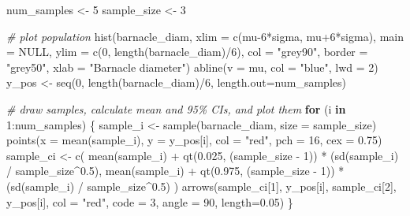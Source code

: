 \documentclass[
  11pt,
  a4paper,
]{book}
\newenvironment{Shaded}{\begin{snugshade}}{\end{snugshade}}
\newcommand{\AttributeTok}[1]{\textcolor[rgb]{0.77,0.63,0.00}{#1}}
\newcommand{\CommentTok}[1]{\textcolor[rgb]{0.56,0.35,0.01}{\textit{#1}}}
\newcommand{\ConstantTok}[1]{\textcolor[rgb]{0.00,0.00,0.00}{#1}}
\newcommand{\ControlFlowTok}[1]{\textcolor[rgb]{0.13,0.29,0.53}{\textbf{#1}}}
\newcommand{\DecValTok}[1]{\textcolor[rgb]{0.00,0.00,0.81}{#1}}
\newcommand{\FloatTok}[1]{\textcolor[rgb]{0.00,0.00,0.81}{#1}}
\newcommand{\FunctionTok}[1]{\textcolor[rgb]{0.00,0.00,0.00}{#1}}
\newcommand{\NormalTok}[1]{#1}
\newcommand{\OtherTok}[1]{\textcolor[rgb]{0.56,0.35,0.01}{#1}}
\newcommand{\SpecialCharTok}[1]{\textcolor[rgb]{0.00,0.00,0.00}{#1}}
\newcommand{\StringTok}[1]{\textcolor[rgb]{0.31,0.60,0.02}{#1}}
\begin{document}
\begin{Shaded}
\begin{Highlighting}[]
\NormalTok{num\_samples }\OtherTok{\textless{}{-}} \DecValTok{5}
\NormalTok{sample\_size }\OtherTok{\textless{}{-}} \DecValTok{3}

\CommentTok{\# plot population}
\FunctionTok{hist}\NormalTok{(barnacle\_diam, }\AttributeTok{xlim =} \FunctionTok{c}\NormalTok{(mu}\DecValTok{{-}6}\SpecialCharTok{*}\NormalTok{sigma, mu}\SpecialCharTok{+}\DecValTok{6}\SpecialCharTok{*}\NormalTok{sigma), }
     \AttributeTok{main =} \ConstantTok{NULL}\NormalTok{, }\AttributeTok{ylim =} \FunctionTok{c}\NormalTok{(}\DecValTok{0}\NormalTok{, }\FunctionTok{length}\NormalTok{(barnacle\_diam)}\SpecialCharTok{/}\DecValTok{6}\NormalTok{),}
     \AttributeTok{col =} \StringTok{"grey90"}\NormalTok{, }\AttributeTok{border =} \StringTok{"grey50"}\NormalTok{, }\AttributeTok{xlab =} \StringTok{"Barnacle diameter"}\NormalTok{)}
\FunctionTok{abline}\NormalTok{(}\AttributeTok{v =}\NormalTok{ mu, }\AttributeTok{col =} \StringTok{"blue"}\NormalTok{, }\AttributeTok{lwd =} \DecValTok{2}\NormalTok{)}
\NormalTok{y\_pos }\OtherTok{\textless{}{-}} \FunctionTok{seq}\NormalTok{(}\DecValTok{0}\NormalTok{, }\FunctionTok{length}\NormalTok{(barnacle\_diam)}\SpecialCharTok{/}\DecValTok{6}\NormalTok{, }\AttributeTok{length.out=}\NormalTok{num\_samples)}

\CommentTok{\# draw samples, calculate mean and 95\% CIs, and plot them}
\ControlFlowTok{for}\NormalTok{ (i }\ControlFlowTok{in} \DecValTok{1}\SpecialCharTok{:}\NormalTok{num\_samples) \{}
\NormalTok{  sample\_i }\OtherTok{\textless{}{-}} \FunctionTok{sample}\NormalTok{(barnacle\_diam, }\AttributeTok{size =}\NormalTok{ sample\_size)}
  \FunctionTok{points}\NormalTok{(}\AttributeTok{x =} \FunctionTok{mean}\NormalTok{(sample\_i), }\AttributeTok{y =}\NormalTok{ y\_pos[i], }\AttributeTok{col =} \StringTok{"red"}\NormalTok{, }\AttributeTok{pch =} \DecValTok{16}\NormalTok{, }\AttributeTok{cex =} \FloatTok{0.75}\NormalTok{)}
\NormalTok{  sample\_ci }\OtherTok{\textless{}{-}} \FunctionTok{c}\NormalTok{(}
    \FunctionTok{mean}\NormalTok{(sample\_i) }\SpecialCharTok{+} \FunctionTok{qt}\NormalTok{(}\FloatTok{0.025}\NormalTok{, (sample\_size }\SpecialCharTok{{-}} \DecValTok{1}\NormalTok{)) }\SpecialCharTok{*}\NormalTok{ (}\FunctionTok{sd}\NormalTok{(sample\_i) }\SpecialCharTok{/}\NormalTok{ sample\_size}\SpecialCharTok{\^{}}\FloatTok{0.5}\NormalTok{),}
    \FunctionTok{mean}\NormalTok{(sample\_i) }\SpecialCharTok{+} \FunctionTok{qt}\NormalTok{(}\FloatTok{0.975}\NormalTok{, (sample\_size }\SpecialCharTok{{-}} \DecValTok{1}\NormalTok{)) }\SpecialCharTok{*}\NormalTok{ (}\FunctionTok{sd}\NormalTok{(sample\_i) }\SpecialCharTok{/}\NormalTok{ sample\_size}\SpecialCharTok{\^{}}\FloatTok{0.5}\NormalTok{)}
\NormalTok{  )}
  \FunctionTok{arrows}\NormalTok{(sample\_ci[}\DecValTok{1}\NormalTok{], y\_pos[i], sample\_ci[}\DecValTok{2}\NormalTok{], y\_pos[i], }
         \AttributeTok{col =} \StringTok{"red"}\NormalTok{, }\AttributeTok{code =} \DecValTok{3}\NormalTok{, }\AttributeTok{angle =} \DecValTok{90}\NormalTok{, }\AttributeTok{length=}\FloatTok{0.05}\NormalTok{)}
\NormalTok{\}}
\end{Highlighting}
\end{Shaded}
\end{document}
